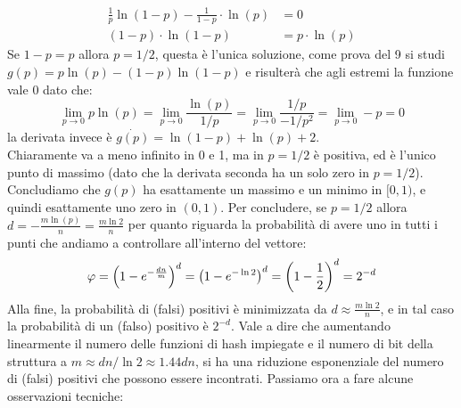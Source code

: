 \begin{align*}
    \frac{1}{p}\ln(1 - p) - \frac{1}{1 - p} \cdot \ln(p) &= 0\\
    (1 - p) \cdot \ln(1 - p) &= p \cdot \ln(p)
\end{align*}
Se $1 - p = p$ allora $p = 1/2$, questa è l'unica soluzione, come prova del 9 si studi $g(p) = p\ln(p) - (1 - p)\ln(1 - p)$ e risulterà che agli estremi la funzione vale 0 dato che:
\begin{equation*}
    \lim_{p \to 0}p \ln(p) = \lim_{p \to 0} \frac{\ln(p)}{1/p} = \lim_{p \to 0} \frac{1/p}{-1/p^2} = \lim_{p \to 0} -p = 0
\end{equation*}
la derivata invece è $\dot{g(p)} = \ln(1 - p) + \ln(p) + 2$.\\
Chiaramente va a meno infinito in 0  e 1, ma in $p = 1/2$ è positiva, ed è l'unico punto di massimo (dato che la derivata seconda ha un solo zero in $p = 1/2$). Concludiamo che $g(p)$ ha esattamente un massimo e un minimo in $[0, 1)$, e quindi esattamente uno zero in $(0, 1)$.
Per concludere, se $p = 1/2$ allora $d = - \frac{m\ln(p)}{n} = \frac{m\ln2}{n}$ per quanto riguarda la probabilità di avere uno in tutti i punti che andiamo a controllare all'interno del vettore:
\begin{equation*}
    \varphi = \left(1 - e^{-\frac{dn}{m}}\right)^d = \left(1 - e^{-\ln2}\right)^d = \left(1 - \frac{1}{2}\right)^d = 2^{-d}
\end{equation*}
Alla fine, la probabilità di (falsi) positivi è minimizzata da $d \approx \frac{m\ln2}{n}$, e in tal caso la probabilità di un (falso) positivo è $2^{-d}$. Vale a dire che aumentando linearmente il numero delle funzioni di hash impiegate e il numero di bit della struttura a $m \approx dn/\ln2 \approx 1.44dn$, si ha una riduzione esponenziale del numero di (falsi) positivi che possono essere incontrati.
Passiamo ora a fare alcune osservazioni tecniche:
